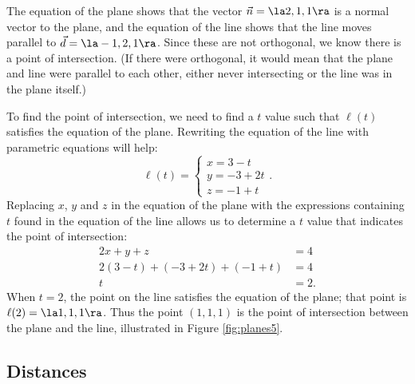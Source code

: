 {The equation of the plane shows that the vector $\vec n = \la 2,1,1\ra$ is a normal vector to the plane, and the equation of the line shows that the line moves parallel to $\vec d = \la -1,2,1\ra$. Since these are not orthogonal, we know there is a point of intersection. (If there were orthogonal, it would mean that the plane and line were parallel to each other, either never intersecting or the line was in the plane itself.)

To find the point of intersection, we need to find a $t$ value such that $\ell(t)$ satisfies the equation of the plane. Rewriting the equation of the line with parametric equations will help:
$$\ell(t) = \begin{cases}x=3-t\\y=-3+2t\\z=-1+t\end{cases}.$$
Replacing $x$, $y$ and $z$ in the equation of the plane with the expressions containing $t$ found in the equation of the line allows us to determine a $t$ value that indicates the point of intersection:
\begin{align*}
2x+y+z &=4 \\
2(3-t) + (-3+2t) + (-1+t) &= 4 \\
t&=2.
\end{align*}
When $t=2$, the point on the line satisfies the equation of the plane; that point is $\ell(2) = \la 1,1,1\ra$. Thus the point $(1,1,1)$ is the point of intersection between the plane and the line, illustrated in Figure \ref{fig:planes5}.
}

\subsection*{Distances}

